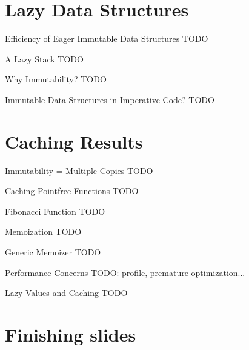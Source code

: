 \documentclass{beamer}
\begin{document}
\section{Lazy Data Structures}
\frame{\tableofcontents[currentsection]}

\begin{frame}{Efficiency of Eager Immutable Data Structures}
  TODO
\end{frame}

\begin{frame}{A Lazy Stack}
  TODO
\end{frame}

\begin{frame}{Why Immutability?}
  TODO
\end{frame}

\begin{frame}{Immutable Data Structures in Imperative Code?}
  TODO
\end{frame}

\section{Caching Results}
\frame{\tableofcontents[currentsection]}

\begin{frame}{Immutability = Multiple Copies}
  TODO
\end{frame}

\begin{frame}{Caching Pointfree Functions}
  TODO
\end{frame}

\begin{frame}{Fibonacci Function}
  TODO
\end{frame}

\begin{frame}{Memoization}
  TODO
\end{frame}

\begin{frame}{Generic Memoizer}
  TODO
\end{frame}

\begin{frame}{Performance Concerns}
  TODO: profile, premature optimization...
\end{frame}

\begin{frame}{Lazy Values and Caching}
  TODO
\end{frame}

\section{Finishing slides}
\frame{\tableofcontents[currentsection]}
\end{document}
